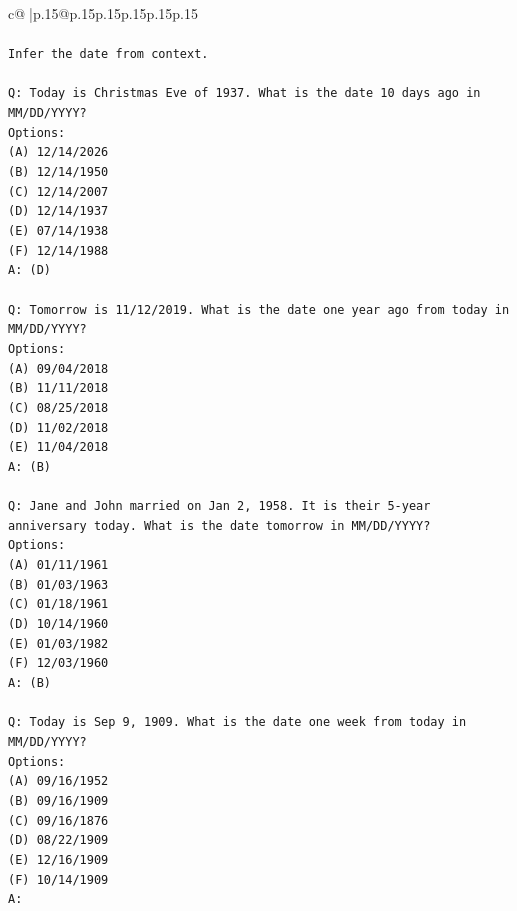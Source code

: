 \documentclass{article}
\begin{document}
{\begin{supertabular}{c@{$\;$}|p{.15\linewidth}@{}p{.15\linewidth}p{.15\linewidth}p{.15\linewidth}p{.15\linewidth}p{.15\linewidth}}
{{{\\ 
\\ 
\texttt{Infer the date from context.} \\
\\ 
\texttt{Q: Today is Christmas Eve of 1937. What is the date 10 days ago in MM/DD/YYYY?} \\
\texttt{Options:} \\
\texttt{(A) 12/14/2026} \\
\texttt{(B) 12/14/1950} \\
\texttt{(C) 12/14/2007} \\
\texttt{(D) 12/14/1937} \\
\texttt{(E) 07/14/1938} \\
\texttt{(F) 12/14/1988} \\
\texttt{A: (D)} \\
\\ 
\texttt{Q: Tomorrow is 11/12/2019. What is the date one year ago from today in MM/DD/YYYY?} \\
\texttt{Options:} \\
\texttt{(A) 09/04/2018} \\
\texttt{(B) 11/11/2018} \\
\texttt{(C) 08/25/2018} \\
\texttt{(D) 11/02/2018} \\
\texttt{(E) 11/04/2018} \\
\texttt{A: (B)} \\
\\ 
\texttt{Q: Jane and John married on Jan 2, 1958. It is their 5{-}year anniversary today. What is the date tomorrow in MM/DD/YYYY?} \\
\texttt{Options:} \\
\texttt{(A) 01/11/1961} \\
\texttt{(B) 01/03/1963} \\
\texttt{(C) 01/18/1961} \\
\texttt{(D) 10/14/1960} \\
\texttt{(E) 01/03/1982} \\
\texttt{(F) 12/03/1960} \\
\texttt{A: (B)} \\
\\ 
\texttt{Q: Today is Sep 9, 1909. What is the date one week from today in MM/DD/YYYY?} \\
\texttt{Options:} \\
\texttt{(A) 09/16/1952} \\
\texttt{(B) 09/16/1909} \\
\texttt{(C) 09/16/1876} \\
\texttt{(D) 08/22/1909} \\
\texttt{(E) 12/16/1909} \\
\texttt{(F) 10/14/1909} \\
\texttt{A:} \\
            }
        }
    }
     \\ \\


\end{supertabular}}
\end{document}
